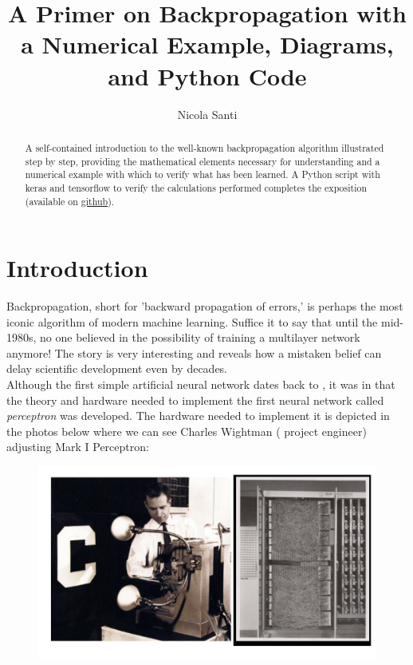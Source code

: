 \documentclass{article}
\title{A Primer on Backpropagation with a Numerical Example, Diagrams, and Python Code }
\author{Nicola Santi}
\begin{document}
\maketitle

\begin{abstract}
A self-contained introduction to the well-known backpropagation algorithm illustrated step by step, providing the mathematical elements necessary for understanding and a numerical example with which to verify what has been learned. A Python script with keras and tensorflow to verify the calculations performed completes the exposition (available on \href{github.com/nicolinux72/backpropagation.git}{github}).

\end{abstract}

\section{Introduction}
Backpropagation, short for 'backward propagation of errors,' is perhaps the most iconic algorithm of modern machine learning. Suffice it to say that until the mid-1980s, no one believed in the possibility of training a multilayer network anymore! The story is very interesting and reveals how a mistaken belief can delay scientific development even by decades. \\

Although the first simple artificial neural network dates back to \textcite{mcculloch43a}, it was in  \textcite{rosenblatt1962principles}  that the theory and hardware needed to implement the first neural network called \textit{perceptron} was developed. The hardware needed to implement it is depicted in the photos below where we can see Charles Wightman ( project engineer)  adjusting Mark I Perceptron:

\begin{figure}[H]
    \centering
    \includegraphics[width=0.8\linewidth]{images/perceptron.png}
\end{figure}
\end{document}
